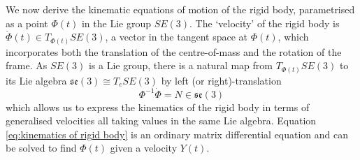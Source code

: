 We now derive the kinematic equations of motion of the rigid body, parametrised as a point $\Phi(t)$ in the Lie group $SE(3)$. The `velocity' of the rigid body is $\dot{\Phi}(t) \in T_{\Phi(t)} SE(3)$, a vector in the tangent space at $\Phi(t)$, which incorporates both the translation of the centre-of-mass and the rotation of the frame. As $SE(3)$ is a Lie group, there is a natural map from $T_{\Phi(t)} SE(3)$ to its Lie algebra $\mathfrak{se}(3) \cong T_{e} SE(3)$ by left (or right)-translation
\begin{equation} \label{eq:kinematics of rigid body}
\Phi^{-1} \dot{\Phi} = N \in \mathfrak{se}(3)
\end{equation}
which allows us to express the kinematics of the rigid body in terms of generalised velocities all taking values in the same Lie algebra. Equation \ref{eq:kinematics of rigid body} is an ordinary matrix differential equation and can be solved to find $\Phi(t)$ given a velocity $Y(t)$. 

